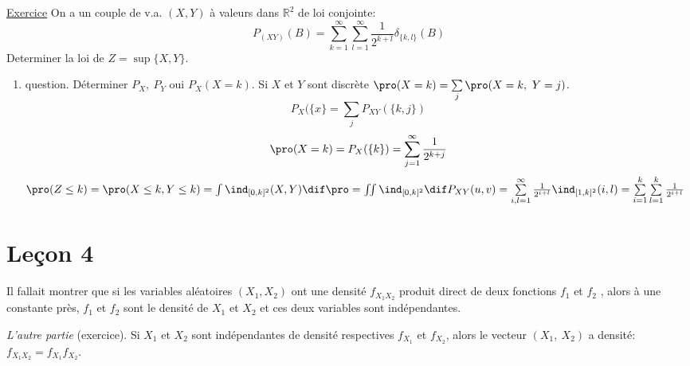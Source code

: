 \underline{Exercice}
On a un couple de v.a. $(X, Y)$ à valeurs dans $\mathbb{R}^2$ de loi conjointe:
$$P_{(XY)}(B)=\sum_{k=1}^\infty\sum_{l=1}^\infty \frac{1}{2^{k+l}}\delta_{\{k, l\}}(B)$$
Determiner la loi de $Z=\sup \{X, Y\}$.
\begin{enumerate}
	\item{question}. Déterminer $P_X,\ P_Y$ oui $P_X(X=k)$.
Si $X$ et $Y$ sont discrète $\pro (X=k)=\sum\limits_j\pro (X=k,\ Y=j)$. $$P_X(\{x\}=\sum\limits_j P_{XY}(\{k, j\})$$
$$\pro (X=k)=P_X(\{k\})=\sum\limits_{j=1}^\infty \frac{1}{2^{k+j}}$$
$\pro (Z\leq k)=\pro (X\leq k, Y\leq k)=\int \ind _{[0, k]^2}(X, Y)\dif \pro =\iint \ind _{[0, k]^2} \dif P_{XY}(u, v)=\sum\limits_{i,l=1}^\infty \frac{1}{2^{i+l}}\ind _{[1, k]^2}(i, l)=\sum\limits_{i=1}^k\sum\limits_{l=1}^k\frac{1}{2^{i+l}}$
\end{enumerate}





\section{Leçon 4} %
\label{sec:lesson_4}

Il fallait montrer que si les variables aléatoires $(X_1, X_2)$ ont une densité $f_{X_1X_2}$ produit direct de deux fonctions $f_1$ et $f_2$ , alors à une constante près, $f_1$ et $f_2$  sont le densité de $X_1$ et $X_2$ et ces deux variables sont indépendantes. 

\emph{L'autre partie} (exercice). Si $X_1$ et $X_2$ sont indépendantes de densité respectives $f_{X_1}$ et $f_{X_2}$, alors le vecteur $(X_1,\ X_2)$ a densité: $f_{X_1X_2}=f_{X_1} f_{X_2}$.

